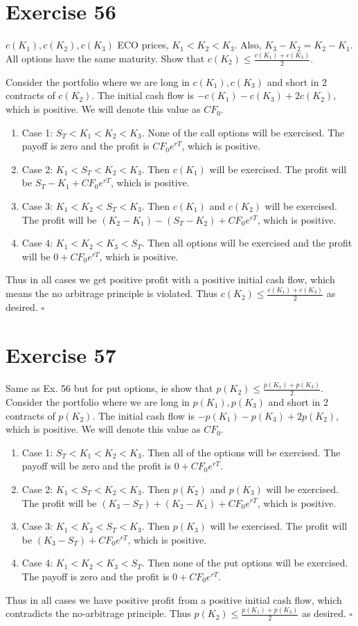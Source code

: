 \documentclass{article}
\begin{document}
\section*{Exercise 56}
$c(K_1), c(K_2), c(K_3)$ ECO prices, $K_1 < K_2 < K_3$. Also, $K_3 - K_2 = K_2 - K_1$. All options have the same maturity. Show that $c(K_2) \leq \frac{c(K_1) + c(K_3)}{2}$.
\begin{flushleft}
    Consider the portfolio where we are long in $c(K_1), c(K_3)$ and short in 2 contracts of $c(K_2)$. The initial cash flow is $-c(K_1) - c(K_3) + 2c(K_2)$, which is positive. We will denote this value as $CF_0$.
    \begin{enumerate}
        \item Case 1: $S_T < K_1 < K_2 < K_3$. None of the call options will be exercised. The payoff is zero and the profit is $CF_0e^{rT}$, which is positive.
        \item Case 2: $K_1 < S_T < K_2 < K_3$. Then $c(K_1)$ will be exercised. The profit will be $S_T - K_1 + CF_0e^{rT}$, which is positive.
        \item Case 3: $K_1 < K_2 < S_T < K_3$. Then $c(K_1)$ and $c(K_2)$ will be exercised. The profit will be $(K_2 - K_1) - (S_T - K_2) + CF_0e^{rT}$, which is positive.
        \item Case 4: $K_1 < K_2 < K_3 < S_T$. Then all options will be exercised and the profit will be $0 + CF_0e^{rT}$, which is positive.
    \end{enumerate}
    Thus in all cases we get positive profit with a positive initial cash flow, which means the no arbitrage principle is violated. Thus $c(K_2) \leq \frac{c(K_1) + c(K_3)}{2}$ as desired. $\square$
\end{flushleft}

\section*{Exercise 57}
Same as Ex. 56 but for put options, ie show that $p(K_2) \leq \frac{p(K_1) + p(K_3)}{2}$. Consider the portfolio where we are long in $p(K_1), p(K_3)$ and short in 2 contracts of $p(K_2)$. The initial cash flow is $-p(K_1)-p(K_3) + 2p(K_2)$, which is positive. We will denote this value as $CF_0$.
\begin{enumerate}
    \item Case 1: $S_T < K_1 < K_2 < K_3$. Then all of the options will be exercised. The payoff will be zero and the profit is $0 + CF_0e^{rT}$.
    \item Case 2: $K_1 < S_T < K_2 < K_3$. Then $p(K_2)$ and $p(K_3)$ will be exercised. The profit will be $(K_3 - S_T) + (K_2 - K_1) + CF_0e^{rT}$, which is positive.
    \item Case 3: $K_1 < K_2 < S_T < K_3$. Then $p(K_3)$ will be exercised. The profit will be $(K_3 - S_T) + CF_0e^{rT}$, which is positive.
    \item Case 4: $K_1 < K_2 < K_3 < S_T$. Then none of the put options will be exercised. The payoff is zero and the profit is $0 + CF_0e^{rT}$.
\end{enumerate}
Thus in all cases we have positive profit from a positive initial cash flow, which contradicts the no-arbitrage principle. Thus $p(K_2) \leq \frac{p(K_1) + p(K_3)}{2}$ as desired. $\square$
\end{document}

